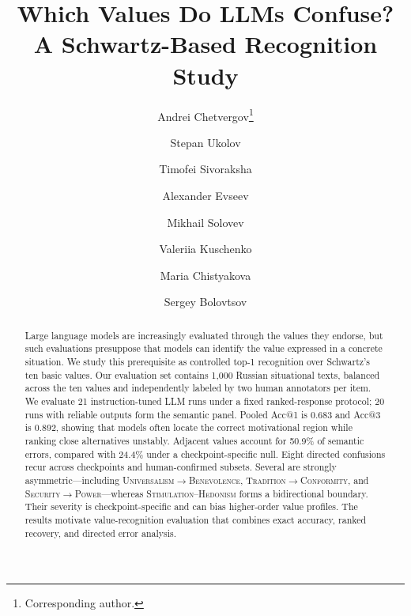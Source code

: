 \documentclass[runningheads,a4paper]{llncs}
\makeatletter
\newcommand{\val}[1]{\textsc{#1}}
\newcommand{\acc}{Acc@1}
\newcommand{\accthree}{Acc@3}
\makeatother
\begin{document}
\raggedbottom

\title{Which Values Do LLMs Confuse? A Schwartz-Based Recognition Study}
\author{Andrei Chetvergov\thanks{Corresponding author.} \and
Stepan Ukolov \and
Timofei Sivoraksha \and
Alexander Evseev \and
Mikhail Solovev \and
Valeriia Kuschenko \and
Maria Chistyakova \and
Sergey Bolovtsov}
\maketitle

\begin{abstract}
Large language models are increasingly evaluated through the values they endorse, but such evaluations presuppose that models can identify the value expressed in a concrete situation. We study this prerequisite as controlled top-1 recognition over Schwartz's ten basic values. Our evaluation set contains 1,000 Russian situational texts, balanced across the ten values and independently labeled by two human annotators per item. We evaluate 21 instruction-tuned LLM runs under a fixed ranked-response protocol; 20 runs with reliable outputs form the semantic panel. Pooled \acc{} is 0.683 and \accthree{} is 0.892, showing that models often locate the correct motivational region while ranking close alternatives unstably. Adjacent values account for 50.9\% of semantic errors, compared with 24.4\% under a checkpoint-specific null. Eight directed confusions recur across checkpoints and human-confirmed subsets. Several are strongly asymmetric---including \val{Universalism}$\rightarrow$\val{Benevolence}, \val{Tradition}$\rightarrow$\val{Conformity}, and \val{Security}$\rightarrow$\val{Power}---whereas \val{Stimulation}--\val{Hedonism} forms a bidirectional boundary. Their severity is checkpoint-specific and can bias higher-order value profiles. The results motivate value-recognition evaluation that combines exact accuracy, ranked recovery, and directed error analysis.
\end{abstract}
\end{document}
